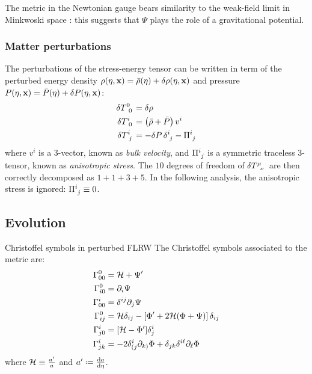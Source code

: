 The metric in the Newtonian gauge bears similarity to the weak-field limit in Minkwoski space : this suggests that $ \Psi $ plays the role of a gravitational potential.

\subsubsection{Matter perturbations}

The perturbations of the stress-energy tensor can be written in term of the perturbed energy density $ \rho(\eta , \mathbf{x}) = \bar \rho(\eta) + \delta \rho(\eta , \mathbf{x}) $ and pressure $ P(\eta , \mathbf{x}) = \bar P(\eta) + \delta P(\eta , \mathbf{x}) $:
\begin{align}
  \tensor{\delta T}{^0_0} & = \delta \rho \\
  \tensor{\delta T}{^i_0} & = \left( \bar{\rho} + \bar{P} \right) v^i \\
  \tensor{\delta T}{^i_j} & = - \delta P \, \tensor{\delta}{^i_j} - \tensor{\Pi}{^i_j}
\end{align}
where $ v^i $ is a 3-vector, known as \emph{bulk velocity}, and $ \tensor{\Pi}{^i_j} $ is a symmetric traceless 3-tensor, known as \emph{anisotropic stress}. The $ 10 $ degrees of freedom of $ \delta \tensor{T}{^\mu_\nu} $ are then correctly decomposed as $ 1 + 1 + 3 + 5 $.
In the following analysis, the anisotropic stress is ignored: $ \tensor{\Pi}{^i_j} \equiv 0 $.

\subsection{Evolution}

\begin{lemma}{Christoffel symbols in perturbed FLRW}{}
  The Christoffel symbols associated to the metric  are:
  \begin{align}
    \Gamma^0_{00} & = \mathcal{H} + \Psi' \\
    \Gamma^0_{i0} & = \partial_i \Psi \\
    \Gamma^i_{00} & = \delta^{ij} \partial_j \Psi \\
    \Gamma^0_{ij} & = \mathcal{H} \delta_{ij} - \left[ \Phi' + 2\mathcal{H} (\Phi + \Psi) \right] \delta_{ij} \\
    \Gamma^i_{j0} & = [\mathcal{H} - \Phi'] \delta^i_j \\
    \Gamma^i_{jk} & = - 2 \delta^i_{(j} \partial_{k)} \Phi + \delta_{jk} \delta^{i\ell} \partial_\ell \Phi
  \end{align}
  where $ \mathcal{H} \equiv \frac{a'}{a} $ and $ a' \defeq \frac{\dd a}{\dd \eta} $.
\end{lemma}

